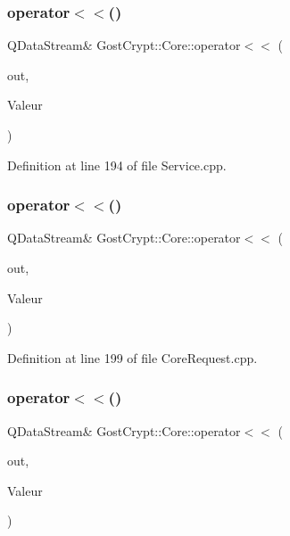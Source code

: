 \subsubsection{\texorpdfstring{operator$<$$<$()}{operator<<()}\hspace{0.1cm}{\footnotesize\ttfamily [35/56]}}
{\footnotesize\ttfamily Q\+Data\+Stream\& Gost\+Crypt\+::\+Core\+::operator$<$$<$ (\begin{DoxyParamCaption}\item[{Q\+Data\+Stream \&}]{out,  }\item[{const \hyperlink{struct_gost_crypt_1_1_core_1_1_exit_request}{Exit\+Request} \&}]{Valeur }\end{DoxyParamCaption})}



Definition at line 194 of file Service.\+cpp.

\mbox{\label{namespace_gost_crypt_1_1_core_a36883f20f283a920357e910ae1124bbd}} 
\subsubsection{\texorpdfstring{operator$<$$<$()}{operator<<()}\hspace{0.1cm}{\footnotesize\ttfamily [36/56]}}
{\footnotesize\ttfamily Q\+Data\+Stream\& Gost\+Crypt\+::\+Core\+::operator$<$$<$ (\begin{DoxyParamCaption}\item[{Q\+Data\+Stream \&}]{out,  }\item[{const \hyperlink{struct_gost_crypt_1_1_core_1_1_get_host_devices_request}{Get\+Host\+Devices\+Request} \&}]{Valeur }\end{DoxyParamCaption})}



Definition at line 199 of file Core\+Request.\+cpp.

\mbox{\label{namespace_gost_crypt_1_1_core_a9ab7e2360d2999e75a160217f9661dfb}} 
\subsubsection{\texorpdfstring{operator$<$$<$()}{operator<<()}\hspace{0.1cm}{\footnotesize\ttfamily [37/56]}}
{\footnotesize\ttfamily Q\+Data\+Stream\& Gost\+Crypt\+::\+Core\+::operator$<$$<$ (\begin{DoxyParamCaption}\item[{Q\+Data\+Stream \&}]{out,  }\item[{const \hyperlink{struct_gost_crypt_1_1_core_1_1_mounted_filesystem}{Mounted\+Filesystem} \&}]{Valeur }\end{DoxyParamCaption})}



